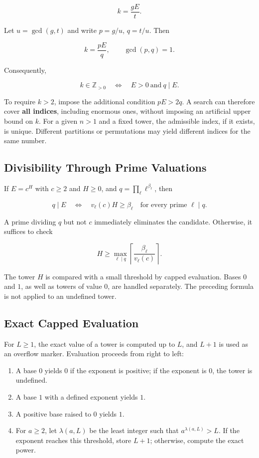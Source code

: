 \documentclass[11pt,a4paper]{article}
\begin{document}
\[
k=\frac{gE}{t}.
\]

Let $u=\gcd(g,t)$ and write $p=g/u$, $q=t/u$. Then

\[
k=\frac{pE}{q},\qquad \gcd(p,q)=1.
\]

Consequently,

\[
k\in\mathbb Z_{>0}
\quad\Longleftrightarrow\quad E>0\ \text{and}\ q\mid E.
\]

To require $k>2$, impose the additional condition $pE>2q$. A search can therefore cover \textbf{all indices}, including enormous ones, without imposing an artificial upper bound on $k$. For a given $n>1$ and a fixed tower, the admissible index, if it exists, is unique. Different partitions or permutations may yield different indices for the same number.

\subsection{Divisibility Through Prime Valuations}

If $E=c^H$ with $c\geq2$ and $H\geq0$, and $q=\prod_\ell\ell^{\beta_\ell}$, then

\[
q\mid E
\quad\Longleftrightarrow\quad
v_\ell(c)H\geq\beta_\ell
\quad\text{for every prime }\ell\mid q.
\]

A prime dividing $q$ but not $c$ immediately eliminates the candidate. Otherwise, it suffices to check

\[
H\geq
\max_{\ell\mid q}
\left\lceil\frac{\beta_\ell}{v_\ell(c)}\right\rceil.
\]

The tower $H$ is compared with a small threshold by capped evaluation. Bases $0$ and $1$, as well as towers of value $0$, are handled separately. The preceding formula is not applied to an undefined tower.

\subsection{Exact Capped Evaluation}

For $L\geq1$, the exact value of a tower is computed up to $L$, and $L+1$ is used as an overflow marker. Evaluation proceeds from right to left:

\begin{enumerate}
\item A base $0$ yields $0$ if the exponent is positive; if the exponent is $0$, the tower is undefined.
\item A base $1$ with a defined exponent yields $1$.
\item A positive base raised to $0$ yields $1$.
\item For $a\geq2$, let $\lambda(a,L)$ be the least integer such that $a^{\lambda(a,L)}>L$. If the exponent reaches this threshold, store $L+1$; otherwise, compute the exact power.
\end{enumerate}
\end{document}
